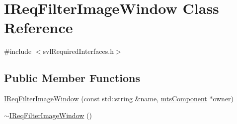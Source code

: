 \hypertarget{class_i_req_filter_image_window}{\section{I\-Req\-Filter\-Image\-Window Class Reference}
\label{class_i_req_filter_image_window}
}


{\ttfamily \#include $<$svl\-Required\-Interfaces.\-h$>$}

\subsection*{Public Member Functions}
\begin{DoxyCompactItemize}
\item 
\hyperlink{class_i_req_filter_image_window_a8b35a80a3c595aa512d9854c11dba249}{I\-Req\-Filter\-Image\-Window} (const std\-::string \&name, \hyperlink{classmts_component}{mts\-Component} $\ast$owner)
\item 
\hyperlink{class_i_req_filter_image_window_a5f306d705296094d03f5bded846f063b}{$\sim$\-I\-Req\-Filter\-Image\-Window} ()
\end{DoxyCompactItemize}
